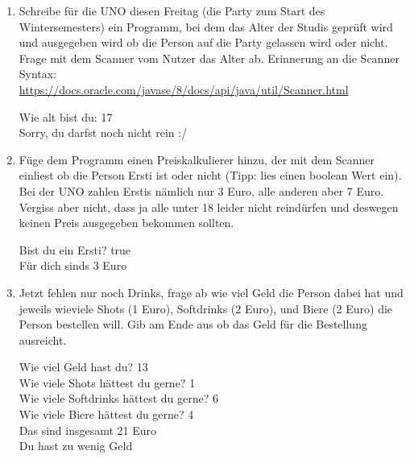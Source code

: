 \documentclass{../../sheet}
\begin{document}
\newpage
{}
\begin{enumerate}
    \item Schreibe für die UNO diesen Freitag (die Party zum Start des Wintersemesters) ein Programm, bei dem das Alter der Studis geprüft wird und ausgegeben wird ob die Person auf die Party gelassen wird oder nicht. Frage mit dem Scanner vom Nutzer das Alter ab. Erinnerung an die Scanner Syntax:\\ \url{https://docs.oracle.com/javase/8/docs/api/java/util/Scanner.html}
    \begin{ausgabe}
        Wie alt bist du: 17\\
        Sorry, du darfst noch nicht rein :/
    \end{ausgabe}
    \item Füge dem Programm einen Preiskalkulierer hinzu, der mit dem Scanner einliest ob die Person Ersti ist oder nicht (Tipp: lies einen boolean Wert ein). Bei der UNO zahlen Erstis nämlich nur 3 Euro, alle anderen aber 7 Euro. Vergiss aber nicht, dass ja alle unter 18 leider nicht reindürfen und deswegen keinen Preis ausgegeben bekommen sollten.
    \begin{ausgabe}
        Bist du ein Ersti? true\\
        Für dich sinds 3 Euro
    \end{ausgabe}
    \item Jetzt fehlen nur noch Drinks, frage ab wie viel Geld die Person dabei hat und jeweils wieviele Shots (1 Euro), Softdrinks (2 Euro), und Biere (2 Euro) die Person bestellen will. Gib am Ende aus ob das Geld für die Bestellung ausreicht.
    \begin{ausgabe}
        Wie viel Geld hast du? 13\\
        Wie viele Shots hättest du gerne? 1\\
        Wie viele Softdrinks hättest du gerne? 6\\
        Wie viele Biere hättest du gerne? 4\\
        Das sind insgesamt 21 Euro\\
        Du hast zu wenig Geld
    \end{ausgabe}
\end{enumerate}
\end{document}
